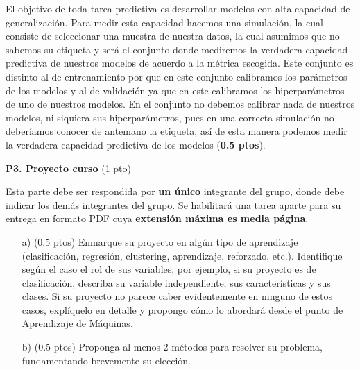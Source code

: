 \documentclass[11pt,letterpaper]{article}
\begin{document}
\begin{enumerate}
El objetivo de toda tarea predictiva es desarrollar modelos con alta capacidad de generalización. Para medir esta capacidad hacemos una simulación, la cual consiste de seleccionar una muestra de nuestra datos, la cual asumimos que no sabemos su etiqueta y será el conjunto donde mediremos la verdadera capacidad predictiva de nuestros modelos de acuerdo a la métrica escogida. Este conjunto es distinto al de entrenamiento por que en este conjunto calibramos los parámetros de los modelos y al de validación ya que en este calibramos los hiperparámetros de uno de nuestros modelos. En el conjunto no debemos calibrar nada de nuestros modelos, ni siquiera sus hiperparámetros, pues en una correcta simulación no deberíamos conocer de antemano la etiqueta, así de esta manera podemos medir la verdadera capacidad predictiva de los modelos (\textbf{0.5 ptos}).


\end{enumerate}

\newpage
\noindent\textbf{P3. Proyecto curso} (1 pto)
\vspace{5mm}

Esta parte debe ser respondida por \textbf{un único} integrante del grupo, donde debe indicar los demás integrantes del grupo. Se habilitará una tarea aparte para su entrega en formato PDF cuya \textbf{extensión máxima es media página}.
\begin{itemize}
    \item[a)] (0.5 ptos) Enmarque su proyecto en algún tipo de aprendizaje (clasificación, regresión, clustering, aprendizaje, reforzado, etc.). Identifique según el caso el rol de sus variables, por ejemplo, si su proyecto es de clasificación, describa su variable independiente, sus características y sus clases. Si su proyecto no parece caber evidentemente en ninguno de estos casos, explíquelo en detalle y propongo cómo lo abordará desde el punto de Aprendizaje de Máquinas.
    \item[b)] (0.5 ptos) Proponga al menos 2 métodos para resolver su problema, fundamentando brevemente su elección.
\end{itemize}
\end{document}

